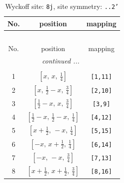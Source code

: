 \documentclass[fleqn,8pt]{jsarticle}
\begin{document}
\begin{longtable}{ccc}
\caption{Wyckoff site: {\tt 8j}, site symmetry: {\tt ..2'}}
 \\
 \hline \hline
No. & position & mapping \\ \hline \endfirsthead

\multicolumn{2}{l}{\tablename\ \thetable{}} \\
 \hline \hline
No. & position & mapping \\ \hline \endhead

 \hline \hline
\multicolumn{2}{r}{\footnotesize\it continued ...} \\ \endfoot

 \hline \hline
\multicolumn{2}{r}{} \\ \endlastfoot

1 & $\left[ x,\, x,\, \frac{1}{4} \right]$ & {\tt [1,11]} \\ \hline
2 & $\left[ x,\, \frac{1}{2} - x,\, \frac{3}{4} \right]$ & {\tt [2,10]} \\ \hline
3 & $\left[ \frac{1}{2} - x,\, x,\, \frac{3}{4} \right]$ & {\tt [3,9]} \\ \hline
4 & $\left[ \frac{1}{2} - x,\, \frac{1}{2} - x,\, \frac{1}{4} \right]$ & {\tt [4,12]} \\ \hline
5 & $\left[ x + \frac{1}{2},\, - x,\, \frac{1}{4} \right]$ & {\tt [5,15]} \\ \hline
6 & $\left[ - x,\, x + \frac{1}{2},\, \frac{1}{4} \right]$ & {\tt [6,14]} \\ \hline
7 & $\left[ - x,\, - x,\, \frac{3}{4} \right]$ & {\tt [7,13]} \\ \hline
8 & $\left[ x + \frac{1}{2},\, x + \frac{1}{2},\, \frac{3}{4} \right]$ & {\tt [8,16]} \\
\end{longtable}
\renewcommand{\arraystretch}{1.2}
\end{document}
